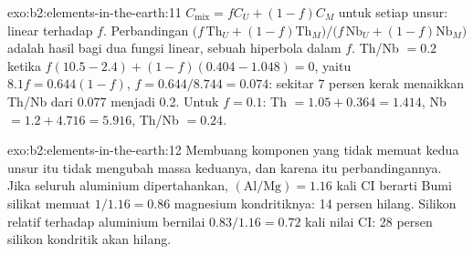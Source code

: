 \begin{solution}{exo:b2:elements-in-the-earth:11}
$C_{\mathrm{mix}} = fC_U + (1-f)C_M$ untuk setiap unsur: linear terhadap $f$. Perbandingan
$\bigl(f\,\mathrm{Th}_U + (1-f)\mathrm{Th}_M\bigr)/\bigl(f\,\mathrm{Nb}_U +
(1-f)\mathrm{Nb}_M\bigr)$ adalah hasil bagi dua fungsi linear, sebuah hiperbola dalam $f$.
Th/Nb $= 0.2$ ketika $f(10.5-2.4) + (1-f)(0.404-1.048) = 0$, yaitu $8.1f = 0.644(1-f)$,
$f = 0.644/8.744 = 0.074$: sekitar 7 persen kerak menaikkan Th/Nb dari 0.077 menjadi 0.2. Untuk
$f = 0.1$: Th $= 1.05 + 0.364 = 1.414$, Nb $= 1.2 + 4.716 = 5.916$, Th/Nb $= 0.24$.
\end{solution}

\begin{solution}{exo:b2:elements-in-the-earth:12}
Membuang komponen yang tidak memuat kedua unsur itu tidak mengubah massa keduanya, dan karena itu perbandingannya.
Jika seluruh aluminium dipertahankan, $(\mathrm{Al}/\mathrm{Mg}) = 1.16$ kali CI
berarti Bumi silikat memuat $1/1.16 = 0.86$ magnesium kondritiknya: 14 persen
hilang. Silikon relatif terhadap aluminium bernilai $0.83/1.16 = 0.72$ kali nilai CI:
28 persen silikon kondritik akan hilang.
\end{solution}


